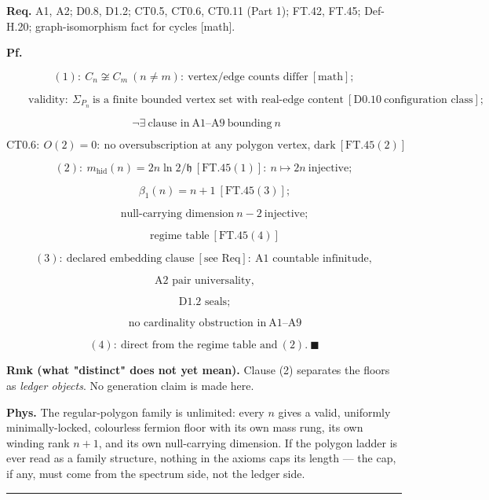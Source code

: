 \begin{theorem}
\textbf{Req.} A1, A2; D0.8, D1.2; CT0.5, CT0.6, CT0.11 (Part 1); FT.42, FT.45; Def-H.20; graph-isomorphism fact for cycles [math].

\textbf{Pf.}

\[
(1):\ C_n\not\cong C_m\ (n\ne m):\ \text{vertex/edge counts differ}\ [\text{math}];
\]

\[
\qquad \text{validity}:\ \Sigma_{P_n}\ \text{is a finite bounded vertex set with real-edge content}\ [\mathrm{D0.10}\ \text{configuration class}];
\]

\[
\ \ \neg\exists\ \text{clause in}\ \mathrm{A1}\text{--}\mathrm{A9}\ \text{bounding}\ n
\]

\[
\mathrm{CT0.6}:\ O(2)=0:\ \text{no oversubscription at any polygon vertex, dark}\ [\mathrm{FT.45}(2)]
\]

\[
(2):\ m_{\mathrm{hid}}(n)=2n\ln2/\mathfrak h\ [\mathrm{FT.45}(1)]:\ n\mapsto2n\ \text{injective};
\]

\[
\qquad \beta_1(n)=n+1\ [\mathrm{FT.45}(3)];
\]

\[
\qquad \text{null-carrying dimension}\ n-2\ \text{injective};
\]

\[
\qquad \text{regime table}\ [\mathrm{FT.45}(4)]
\]

\[
(3):\ \text{declared embedding clause}\ [\text{see Req}]:\ \text{A1 countable infinitude},
\]

\[
\ \text{A2 pair universality},
\]

\[
\ \text{D1.2 seals};
\]

\[
\qquad \text{no cardinality obstruction in}\ \mathrm{A1}\text{--}\mathrm{A9}
\]

\[
(4):\ \text{direct from the regime table and}\ (2).\ \blacksquare
\]

\textbf{Rmk (what "distinct" does not yet mean).} Clause (2) separates the floors as \textit{ledger objects}. No generation claim is made here.

\textbf{Phys.} The regular-polygon family is unlimited: every $n$ gives a valid, uniformly minimally-locked, colourless fermion floor with its own mass rung, its own winding rank $n{+}1$, and its own null-carrying dimension. If the polygon ladder is ever read as a family structure, nothing in the axioms caps its length — the cap, if any, must come from the spectrum side, not the ledger side.

\vspace{2pt}\noindent\rule{\textwidth}{0.4pt}\vspace{2pt}

\end{theorem}

